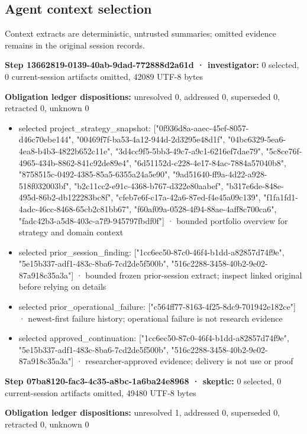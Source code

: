 \documentclass[11pt]{article}
\begin{document}
\subsection{Agent context selection}
Context extracts are deterministic, untrusted summaries; omitted evidence remains in the original session records.\par
\textbf{Step 13662819-0139-40ab-9dad-772888d2a61d · investigator:} 0 selected, 0 current-session artifacts omitted, 42089 UTF-8 bytes\par
\textbf{Obligation ledger dispositions:} unresolved 0, addressed 0, superseded 0, retracted 0, unknown 0\par
\begin{itemize}
\item selected project\_strategy\_snapshot: ["0f936d8a-aaec-45ef-8057-d46c70ebe144", "00469f7f-ba53-4a12-944d-2d3295e48d1f", "04bc6329-5ea6-4ea8-b4b3-4822b652c11e", "3d4cc9f5-5bb3-49c7-a9c1-6216ef7dae79", "5c8ce76f-4965-434b-8862-841c92de89e4", "6d51152d-c228-4e17-84ac-7884a57040b8", "8758515c-0492-4385-85a5-6355a24a5e90", "9ad51640-ff9a-4d22-a928-518f032003bf", "b2c11cc2-e91c-4368-b767-d322e80aabef", "b317e6de-848e-495d-86b2-db122283bc8f", "cfeb7e6f-c17a-42a6-87ed-f4e45a09c139", "f1fa1fd1-4adc-46cc-8468-65cb2c81bb67", "f60af09a-0528-4f94-88ae-4aff8c700ca6", "fadc42b3-a5d8-403c-a7f9-945797fbdf0f"] · bounded portfolio overview for strategy and domain context
\item selected prior\_session\_finding: ["1cc6ec50-87c0-46f4-b1dd-a82857d74f9e", "5e15b337-adf1-483c-8ba6-7cd2de5f500b", "516c2288-3458-40b2-9e02-87a918c35a3a"] · bounded frozen prior-session extract; inspect linked original before relying on details
\item selected prior\_operational\_failure: ["c564ff77-8163-4f25-8dc9-701942e182ce"] · newest-first failure history; operational failure is not research evidence
\item selected approved\_continuation: ["1cc6ec50-87c0-46f4-b1dd-a82857d74f9e", "5e15b337-adf1-483c-8ba6-7cd2de5f500b", "516c2288-3458-40b2-9e02-87a918c35a3a"] · researcher-approved evidence; delivery is not use or proof
\end{itemize}
\textbf{Step 07ba8120-fac3-4c35-a8bc-1a6ba24e8968 · skeptic:} 0 selected, 0 current-session artifacts omitted, 49480 UTF-8 bytes\par
\textbf{Obligation ledger dispositions:} unresolved 1, addressed 0, superseded 0, retracted 0, unknown 0\par
\end{document}
